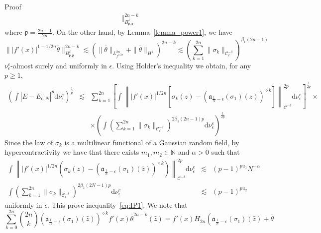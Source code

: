 \documentclass[a4paper,10pt]{article}
\newcommand{\mathd}{\mathrm{d}}
\newenvironment{proof*}[1]{\noindent\textbf{#1\ }}{\hspace*{\fill}$\Box$\medskip}
\begin{document}
\begin{proof*}{Proof}
\begin{eqnarray}
    \|_{B^{\delta}_{\mathfrak{p, \mathfrak{p}}}}^{2 n - k} \nonumber
  \end{eqnarray}
  where $\mathfrak{p} = \frac{2 n - 1}{2 n}$. On the other hand, by
  Lemma~\ref{lemma_power1}, we have
  \[ \| | f' (x) |^{1 - 1 / 2 n} \bar{\theta} \|_{B^{\delta}_{\mathfrak{p,
     \mathfrak{p}}}}^{2 n - k} \lesssim \left( \| \bar{\theta} \|_{L^{2
     n}_{f^{1 / 2 n}}} + \| \bar{\theta} \|_{H^1} \right)^{2 n - k} \lesssim
     \left( \sum_{k = 1}^{2 n} \| \sigma_k \|_{\mathcal{C}^{- \delta}_{\ell}}
     \right)^{\beta_1 (2 n - 1)} \]
  $\nu^e_{\epsilon}$-almost surely and uniformly in $\epsilon$. Using Holder's
  inequality we obtain, for any $p \geq 1$,
  \begin{eqnarray}
    \left( \int | E - E_{\epsilon, N} |^p \mathd \nu_{\epsilon}^e
    \right)^{\frac{1}{p}} & \lesssim & \sum_{k = 1}^{2 n} \left[ \int \left\|
    | f' (x) |^{1 / 2 n} \left[ \sigma_k (z) - \left(
    \mathfrak{a}_{\frac{1}{N} - \epsilon} (\sigma_1) (\hat{z})
    \right)^{\diamond k} \right] \right\|_{\mathcal{C}^{- \delta}}^{2 p}
    \mathd \nu^e_{\epsilon} \right]^{\frac{1}{2 p}} \times \nonumber\\
    &  & \times \left( \int \left( \sum_{k = 1}^{2 n} \| \sigma_k
    \|_{\mathcal{C}^{- \delta}_{\ell}} \right)^{2 \beta_1 (2 n - 1) p} \mathd
    \nu_{\epsilon}^e \right)^{\frac{1}{2 p}} \nonumber
  \end{eqnarray}
  Since the law of $\sigma_k$ is a multilinear functional of a Gaussian random
  field, by hypercontractivity we have that there exists $m_1, m_2 \in
  \mathbb{N}$ and $\alpha > 0$ such that
  \begin{eqnarray}
    \int \left\| | f' (x) |^{1 / 2 n} \left( \sigma_k (z) - \left(
    \mathfrak{a}_{\frac{1}{N} - \epsilon} (\sigma_1) (\hat{z})
    \right)^{\diamond k} \right) \right\|_{\mathcal{C}^{- \delta}}^{2 p}
    \mathd \nu^e_{\epsilon} & \lesssim & (p - 1)^{p u_1} N^{- \alpha}
    \nonumber\\
    \int \left( \sum_{k = 1}^{2 n} \| \sigma_k \|_{\mathcal{C}^{-
    \delta}_{\ell}} \right)^{2 \beta_1 (2 N - 1) p} \mathd \nu_{\epsilon}^e &
    \lesssim & (p - 1)^{p u_2} \nonumber
  \end{eqnarray}
  uniformly in $\epsilon$. This prove inequality~{\eqref{eq:IP1}}. We note
  that
  \[ \sum_{k = 0}^{2 n} \binom{2 n}{k} \left( \mathfrak{a}_{\frac{1}{N} -
     \epsilon} (\sigma_1) (\hat{z}) \right)^{\diamond k} f' (x) 
     \bar{\theta}^{2 n - k} (\hat{z}) = f' (x) H_{2 n} \left(
     \mathfrak{a}_{\frac{1}{N} - \epsilon} (\sigma_1) (\hat{z}) + \bar{\theta}
\]
\end{proof*}
\end{document}
